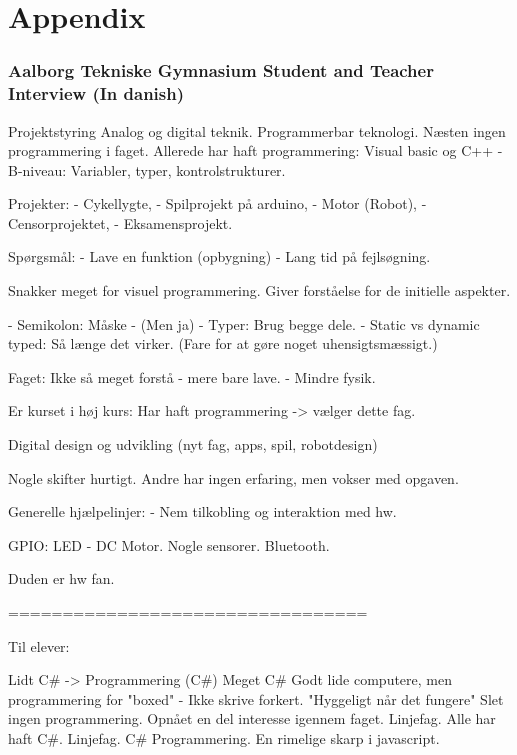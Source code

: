 \part{Appendix}

\section{Aalborg Tekniske Gymnasium Student and Teacher Interview (In danish)}
\label{Interviews}
Projektstyring
Analog og digital teknik.
Programmerbar teknologi.
Næsten ingen programmering i faget.
Allerede har haft programmering: Visual basic og C++
- B-niveau: Variabler, typer, kontrolstrukturer. 


Projekter:
- Cykellygte,
- Spilprojekt på arduino,
- Motor (Robot),
- Censorprojektet,
- Eksamensprojekt.

Spørgsmål: 
- Lave en funktion (opbygning)
- Lang tid på fejlsøgning.

Snakker meget for visuel programmering.
Giver forståelse for de initielle aspekter.


- Semikolon: Måske - (Men ja)
- Typer: Brug begge dele.
- Static vs dynamic typed: Så længe det virker. (Fare for at gøre noget uhensigtsmæssigt.)

Faget: Ikke så meget forstå - mere bare lave. - Mindre fysik.

Er kurset i høj kurs: Har haft programmering -> vælger dette fag.

Digital design og udvikling (nyt fag, apps, spil, robotdesign)

Nogle skifter hurtigt. Andre har ingen erfaring, men vokser med opgaven.

Generelle hjælpelinjer:
- Nem tilkobling og interaktion med hw.

GPIO: LED - DC Motor. Nogle sensorer. Bluetooth.

Duden er hw fan.

=================================

Til elever:

Lidt C{\#} -> Programmering (C{\#})
Meget C{\#}
Godt lide computere, men programmering for "boxed" - Ikke skrive forkert. 
"Hyggeligt når det fungere"
Slet ingen programmering.
Opnået en del interesse igennem faget.
Linjefag. Alle har haft C{\#}.
Linjefag. C{\#} Programmering.
En rimelige skarp i javascript.

